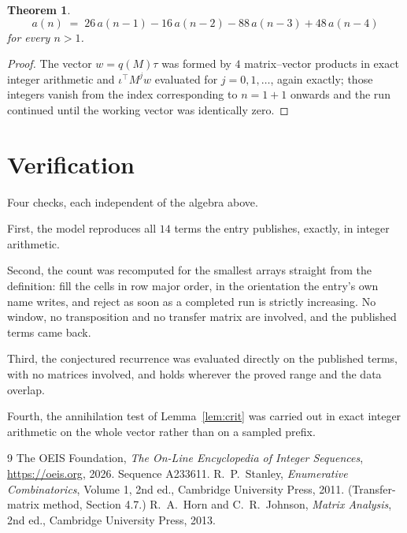 \documentclass[11pt,a4paper]{article}
\theoremstyle{plain}
\newtheorem{theorem}{Theorem}
\theoremstyle{definition}
\begin{document}
\begin{theorem}
\[
a(n)\;=\;26\,a(n-1) - 16\,a(n-2) - 88\,a(n-3) + 48\,a(n-4)
\]
for every $n>1$.
\end{theorem}

\begin{proof}
The vector $w=q(M)\tau$ was formed by $4$ matrix--vector products in exact integer
arithmetic and $\iota^{\!\top}M^{j}w$ evaluated for $j=0,1,\dots$, again exactly; those
integers vanish from the index corresponding to $n=1+1$ onwards and the run continued
until the working vector was identically zero.
\end{proof}

\section{Verification}

Four checks, each independent of the algebra above.

First, the model reproduces all $14$ terms the entry publishes, exactly, in integer
arithmetic.

Second, the count was recomputed for the smallest arrays straight from the definition: fill the
cells in row major order, in the orientation the entry's own name writes, and reject as soon as
a completed run is strictly increasing. No window, no transposition and no transfer matrix are involved, and
the published terms came back.

Third, the conjectured recurrence was evaluated directly on the published terms, with no
matrices involved, and holds wherever the proved range and the data overlap.

Fourth, the annihilation test of Lemma~\ref{lem:crit} was carried out in exact integer
arithmetic on the whole vector rather than on a sampled prefix.

\begin{thebibliography}{9}
 The OEIS Foundation, \emph{The On-Line Encyclopedia of Integer
Sequences}, \url{https://oeis.org}, 2026. Sequence A233611.
 R.~P.~Stanley, \emph{Enumerative Combinatorics}, Volume 1, 2nd ed.,
Cambridge University Press, 2011. (Transfer-matrix method, Section 4.7.)
 R.~A.~Horn and C.~R.~Johnson, \emph{Matrix Analysis}, 2nd ed., Cambridge
University Press, 2013.
\end{thebibliography}
\end{document}

